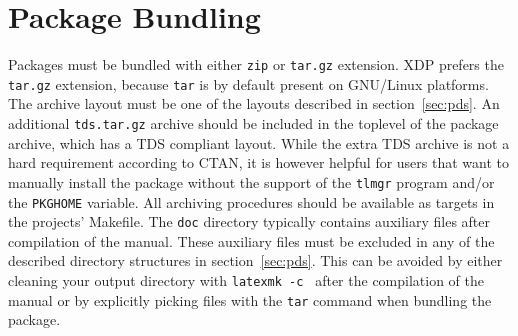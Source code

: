 \documentclass{xdpdoc}
\begin{document}
\begin{multicols}{2}
        \columnbreak
        \label{fig:project dir}


        \section{Package Bundling}\label{sec:bundling}

        Packages must be bundled with either \texttt{zip} or \texttt{tar.gz} extension.
        XDP prefers the \texttt{tar.gz} extension, because \texttt{tar} is by default present on GNU/Linux platforms.
        The archive layout must be one of the layouts described in section~\ref{sec:pds}.
        An additional \texttt{tds.tar.gz} archive should be included in the toplevel of the package archive, which has a TDS compliant layout.
        While the extra TDS archive is not a hard requirement according to CTAN, it is however helpful for users that want to manually install the package without the support of the \texttt{tlmgr} program and/or the \texttt{PKGHOME} variable.
        All archiving procedures should be available as targets in the projects' Makefile.
        The \texttt{doc} directory typically contains auxiliary files after compilation of the manual.
        These auxiliary files must be excluded in any of the described directory structures in section~\ref{sec:pds}.
        This can be avoided by either cleaning your output directory with \texttt{latexmk -c } after the compilation of the manual or by explicitly picking files with the \texttt{tar} command when bundling the package.



\end{multicols}
\end{document}
